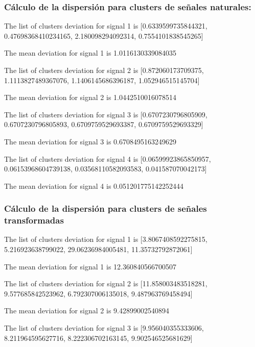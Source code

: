 \documentclass[11pt]{article}
\begin{document}
\hypertarget{cuxe1lculo-de-la-dispersiuxf3n-para-clusters-de-seuxf1ales-naturales}{%
\subsubsection{Cálculo de la dispersión para clusters de señales
naturales:}\label{cuxe1lculo-de-la-dispersiuxf3n-para-clusters-de-seuxf1ales-naturales}}

The list of clusters deviation for signal 1 is {[}0.6339599735844321,
0.47698368410234165, 2.180098294092314, 0.7554101838545265{]}

The mean deviation for signal 1 is 1.0116130339084035

The list of clusters deviation for signal 2 is {[}0.872060173709375,
1.1113827489367076, 1.1406145686396187, 1.052946515145704{]}

The mean deviation for signal 2 is 1.0442510016078514

The list of clusters deviation for signal 3 is {[}0.6707230796805909,
0.6707230796805893, 0.6709759529693387, 0.6709759529693329{]}

The mean deviation for signal 3 is 0.6708495163249629

The list of clusters deviation for signal 4 is {[}0.06599923865850957,
0.06153968604739138, 0.03568110582093583, 0.041587070042173{]}

The mean deviation for signal 4 is 0.051201775142252444

\hypertarget{cuxe1lculo-de-la-dispersiuxf3n-para-clusters-de-seuxf1ales-transformadas}{%
\subsubsection{Cálculo de la dispersión para clusters de señales
transformadas}\label{cuxe1lculo-de-la-dispersiuxf3n-para-clusters-de-seuxf1ales-transformadas}}

The list of clusters deviation for signal 1 is {[}3.8067408592275815,
5.216923638799022, 29.06236984005481, 11.35732792872061{]}

The mean deviation for signal 1 is 12.360840566700507

The list of clusters deviation for signal 2 is {[}11.858003483518281,
9.577685842523962, 6.792307006135018, 9.487963769458494{]}

The mean deviation for signal 2 is 9.42899002540894

The list of clusters deviation for signal 3 is {[}9.956040355333606,
8.211964595627716, 8.222306702163145, 9.902546525681629{]}
\end{document}
